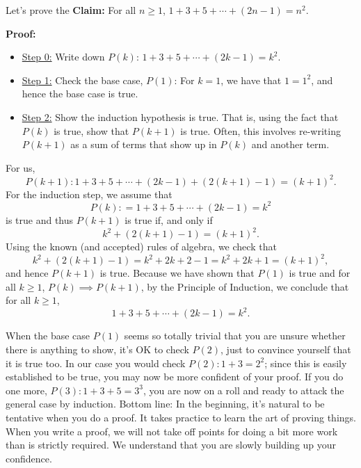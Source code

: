     \vspace*{.2cm}
\begin{example} 
Let's prove the \textbf{Claim:}  For all $n \geq 1$, $1+3+5+\dotsb+(2n-1)=n^2$.
\end{example}

\textbf{Proof:} 

    \begin{itemize}
    \item \underline{Step 0:} Write down $P(k)$: $1+3+5+\dotsb+(2k-1)=k^2$. 
        \item \underline{Step 1:} Check the base case, $P(1)$: For  $k=1$, we have that $ 1 = 1^2 $, and hence the base case is true. 
        \item \underline{Step 2:} Show the induction hypothesis is true. That is, using the fact that $P(k)$ is true, show that $P(k+1)$ is true. Often, this involves re-writing $P(k+1)$ as a sum of terms that show up in $P(k)$ and another term.\\
  
    \end{itemize}
 
 For us,  
 $$P(k+1): 1+3+5+\dotsb+(2k-1)+(2(k+1)-1)=(k+1)^2. $$
For the induction step, we assume that
$$
        P(k): = 1+3+5+\dotsb+(2k-1)=k^2 
$$
is true and thus $P(k+1)$ is true if, and only if 
$$ 
k^2 +(2(k+1)-1) =(k+1)^2.
$$
Using the known (and accepted) rules of algebra, we check that
$$       
k^2 + (2(k+1)-1) = k^2+2k+2-1 = k^2+2k+1 = (k+1)^2,
$$
and hence $P(k+1)$ is true. Because we have shown that $P(1)$ is true and for all $k\ge 1$, $P(k) \implies P(k+1)$, by the Principle of Induction, we conclude that for all $k\ge 1$,
$$ 1+3+5+\dotsb+(2k-1)=k^2.$$
\Qed
\vspace*{.2cm}


\begin{rem}
When the base case $P(1)$ seems so totally trivial that you are unsure whether there is anything to show, it's OK to check $P(2)$, just to convince yourself that it is true too. In our case you would check $P(2): 1 + 3 = 2^2 $; since this is easily established to be true, you may now be more confident of your proof. If you do one more, $P(3): 1 + 3 + 5 = 3^3$, you are now on a roll and ready to attack the general case by induction. Bottom line: In the beginning, it's natural to be tentative when you do a proof. It takes practice to learn the art of proving things. When you write a proof, we will not take off points for doing a bit more work than is strictly required. We understand that you are slowly building up your confidence.
\end{rem} 

